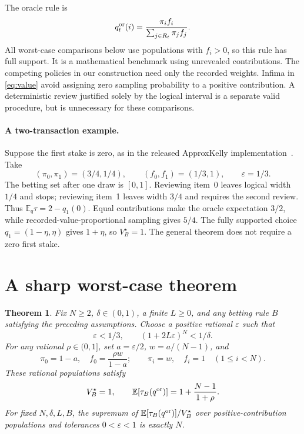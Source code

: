 \documentclass[11pt]{article}
\newtheorem{theorem}{Theorem}
\newcommand{\E}{\mathbb{E}}
\begin{document}
The oracle rule is
\begin{equation}\label{eq:oracle}
 q_t^{\rm or}(i)=\frac{\pi_i f_i}{\sum_{j\in R_t}\pi_j f_j}.
\end{equation}
All worst-case comparisons below use populations with $f_i>0$, so this rule
has full support. It is a mathematical benchmark using unrevealed
contributions. The competing policies in our construction need only the
recorded weights. Infima in \eqref{eq:value} avoid assigning zero sampling
probability to a positive contribution. A deterministic review justified
solely by the logical interval is a separate valid procedure, but is
unnecessary for these comparisons.

\paragraph{A two-transaction example.}
Suppose the first stake is zero, as in the released ApproxKelly
implementation~\cite{implementation}. Take
\[
 (\pi_0,\pi_1)=(3/4,1/4),\qquad (f_0,f_1)=(1/3,1),\qquad
 \varepsilon=1/3.
\]
The betting set after one draw is $[0,1]$. Reviewing item~0 leaves logical
width $1/4$ and stops; reviewing item~1 leaves width $3/4$ and requires the
second review. Thus $\E_q\tau=2-q_1(0)$. Equal contributions make the oracle
expectation $3/2$, while recorded-value-proportional sampling gives $5/4$.
The fully supported choice $q_1=(1-\eta,\eta)$ gives $1+\eta$, so
$V_B^\star=1$. The general theorem does not require a zero first stake.

\section{A sharp worst-case theorem}
\begin{theorem}\label{thm:sharp}
Fix $N\ge2$, $\delta\in(0,1)$, a finite $L\ge0$, and any betting rule $B$
satisfying the preceding assumptions. Choose a positive rational
$\varepsilon$ such that
\begin{equation}\label{eq:small}
 \varepsilon<1/3,\qquad (1+2L\varepsilon)^N<1/\delta.
\end{equation}
For any rational $\rho\in(0,1]$, set $a=\varepsilon/2$, $w=a/(N-1)$, and
\begin{equation}\label{eq:family}
 \pi_0=1-a,\quad f_0=\frac{\rho w}{1-a};\qquad
 \pi_i=w,\quad f_i=1\quad(1\le i<N).
\end{equation}
These rational populations satisfy
\begin{equation}\label{eq:sharp}
 V_B^\star=1,\qquad \E[\tau_B(q^{\rm or})]=1+\frac{N-1}{1+\rho}.
\end{equation}
For fixed $N,\delta,L,B$, the supremum of
$\E[\tau_B(q^{\rm or})]/V_B^\star$ over positive-contribution populations
and tolerances $0<\varepsilon<1$ is exactly $N$.
\end{theorem}
\end{document}
